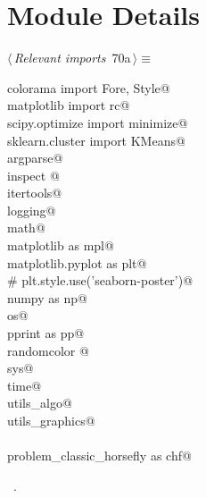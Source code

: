\documentclass[11.5pt]{report}
\begin{document}
\section{Module Details}
\newchunk 
\begin{flushleft} \small
\begin{minipage}{\linewidth}\label{scrap100}\raggedright\small
{} $\langle\,${\itshape Relevant imports}\nobreak\ {\footnotesize {70a}}$\,\rangle\equiv$
\vspace{-1ex}
\begin{list}{}{} \item
\mbox{}\verb@from colorama import Fore, Style@\\
\mbox{}\verb@from matplotlib import rc@\\
\mbox{}\verb@from scipy.optimize import minimize@\\
\mbox{}\verb@from sklearn.cluster import KMeans@\\
\mbox{}\verb@import argparse@\\
\mbox{}\verb@import inspect @\\
\mbox{}\verb@import itertools@\\
\mbox{}\verb@import logging@\\
\mbox{}\verb@import math@\\
\mbox{}\verb@import matplotlib as mpl@\\
\mbox{}\verb@import matplotlib.pyplot as plt@\\
\mbox{}\verb@# plt.style.use('seaborn-poster')@\\
\mbox{}\verb@import numpy as np@\\
\mbox{}\verb@import os@\\
\mbox{}\verb@import pprint as pp@\\
\mbox{}\verb@import randomcolor @\\
\mbox{}\verb@import sys@\\
\mbox{}\verb@import time@\\
\mbox{}\verb@import utils_algo@\\
\mbox{}\verb@import utils_graphics@\\
\mbox{}\verb@@\\
\mbox{}\verb@import problem_classic_horsefly as chf@\\
\mbox{}\verb@@{\NWsep}
\end{list}
\vspace{-1.5ex}
\footnotesize
\begin{list}{}{\setlength{\itemsep}{-\parsep}\setlength{\itemindent}{-\leftmargin}}
\item \NWtxtMacroRefIn\ .

\item{}
\end{list}
\end{minipage}\vspace{4ex}
\end{flushleft}
\end{document}
